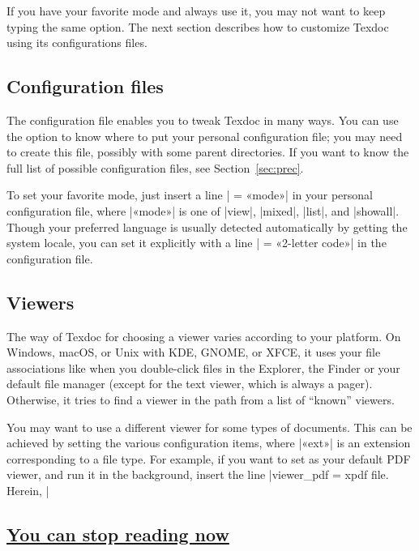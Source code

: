 \documentclass[draft]{texdoc-doc}
\begin{document}
If you have your favorite mode and always use it, you may not want to keep
typing the same option. The next section describes how to customize Texdoc
using its configurations files.

\subsection{Configuration files}
\label{sec:quick-file}

The configuration file enables you to tweak Texdoc in many ways. You can use
the  option to know where to put your personal configuration file;
you may need to create this file, possibly with some parent directories. If you
want to know the full list of possible configuration files, see
Section~\ref{sec:prec}.

To set your favorite mode, just insert a line | = «mode»| in your
personal configuration file, where |«mode»| is one of |view|, |mixed|, |list|,
and |showall|. Though your preferred language is usually detected automatically
by getting the system locale, you can set it explicitly with a line
| = «2-letter code»| in the configuration file.

\subsection{Viewers}
\label{sec:viewer}

The way of Texdoc for choosing a viewer varies according to your platform. On
Windows, macOS, or Unix with KDE, GNOME, or XFCE, it uses your file
associations like when you double-click files in the Explorer, the Finder or
your default file manager (except for the text viewer, which is always a
pager). Otherwise, it tries to find a viewer in the path from a list of
``known'' viewers.

You may want to use a different viewer for some types of documents. This can be
achieved by setting the various  configuration items,
where |«ext»| is an extension corresponding to a file type. For example, if
you want to set  as your default PDF viewer, and run it in the
background, insert the line |viewer_pdf = xpdf %
file. Herein, |%

\subsection*{\underline{You can stop reading now}}
\end{document}
